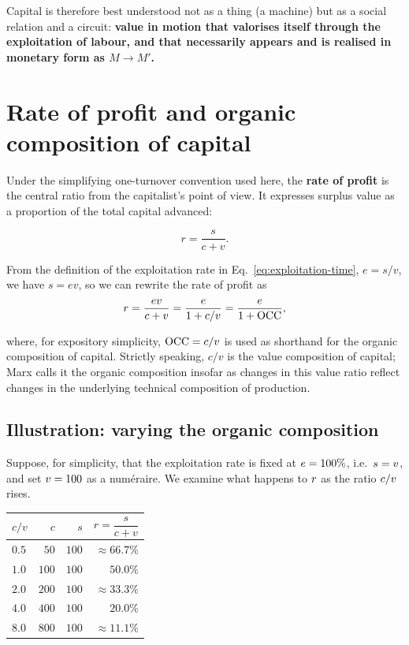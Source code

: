 Capital is therefore best understood not as a thing (a machine) but as a social relation and a circuit:
\textbf{value in motion that valorises itself through the exploitation of labour, and that necessarily appears
and is realised in monetary form as $M \rightarrow M'$.}


\section{Rate of profit and organic composition of capital}
\label{sec:rate-profit}

Under the simplifying one-turnover convention used here, the
\textbf{rate of profit} is the central ratio from the capitalist's point
of view. It expresses surplus value as a proportion of the total capital
advanced:

\begin{equation}
  r = \frac{s}{c + v}.
  \label{eq:profit-rate-basic}
\end{equation}


From the definition of the exploitation rate in Eq.~\eqref{eq:exploitation-time},
\(e = s/v\), we have \(s = e v\), so we can rewrite the rate of profit as
\begin{equation}
  r = \frac{e v}{c + v}
    = \frac{e}{1 + c/v}
    = \frac{e}{1 + \mathrm{OCC}},
  \label{eq:profit-rate-occ}
\end{equation}

where, for expository simplicity, \(\mathrm{OCC}=c/v\) is used as shorthand
for the organic composition of capital. Strictly speaking, \(c/v\) is the value composition of capital; Marx calls it
the organic composition insofar as changes in this value ratio reflect changes
in the underlying technical composition of production.

\subsection{Illustration: varying the organic composition}

Suppose, for simplicity, that the exploitation rate is fixed at
$e = 100\%$, i.e.\ $s = v$, and set $v=100$
as a numéraire. We examine what happens to $r$ as the ratio
$c/v$ rises.

\begin{center}
\begin{tabular}{@{}lrrr@{}}
\toprule
$c/v$ & $c$ & $s$ & $r = \dfrac{s}{c+v}$ \\
\midrule
$0.5$ & $50$  & $100$ & $\approx 66.7\%$ \\
$1.0$ & $100$ & $100$ & $50.0\%$        \\
$2.0$ & $200$ & $100$ & $\approx 33.3\%$ \\
$4.0$ & $400$ & $100$ & $20.0\%$        \\
$8.0$ & $800$ & $100$ & $\approx 11.1\%$ \\
\bottomrule
\end{tabular}
\end{center}

